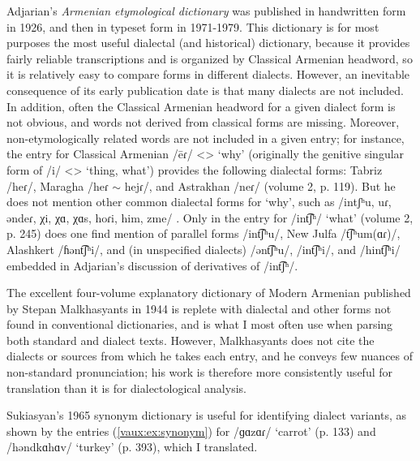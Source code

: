 \documentclass[output=paper]{langscibook}
\begin{document}
Adjarian's \textit{Armenian etymological dictionary} \citep{Adjarian-1979-Etymology} was  published in handwritten form in  1926, and then in typeset form in 1971-1979. This dictionary is for most purposes the most useful dialectal (and historical) dictionary, because it provides fairly reliable transcriptions and is organized by Classical Armenian headword, so it is relatively easy to compare forms in different dialects. However, an inevitable consequence of its early publication date is that many dialects are not included. In addition, often the Classical Armenian headword for a given dialect form is not obvious, and words not derived from classical forms are missing. Moreover, non-etymologically related words are not included in a given entry; for instance, the entry for Classical Armenian /ēɾ/ <> `why' (originally the genitive singular form of /i/ <> `thing, what') provides the following dialectal forms: Tabriz /heɾ/, Maragha /heɾ $\sim$ hejɾ/, and Astrakhan /neɾ/ (volume 2, p. 119). But he does not mention other common dialectal forms for `why', such as /intʃʰu, uɾ, əndeɾ, χi, χɑ, χɑs, hoɾi, him, zme/ \citep[cf.][234]{Sukiasyan-1965-Synonymdictionary}. Only in the entry for /int͡ʃʰ/ `what' (volume 2, p. 245) does one find mention of parallel forms /int͡ʃʰu/, New Julfa /t͡ʃʰum(ɑɾ)/, Alashkert /ɦənt͡ʃʰi/, and (in unspecified dialects) /ənt͡ʃʰu/, /int͡ʃʰi/, and /hint͡ʃʰi/ embedded in Adjarian's discussion of derivatives of /int͡ʃʰ/. 



The excellent four-volume explanatory dictionary of Modern Armenian published by Stepan Malkhasyants   in 1944 \citep{Malkhasiants-1944-ArmenianDictionary} is replete with dialectal and other forms not found in conventional dictionaries, and is what I most often use when parsing both standard and dialect texts. However, Malkhasyants does not cite the dialects or sources from which he takes each entry, and he conveys few nuances of non-standard pronunciation; his work is therefore more consistently useful for translation than it is for dialectological analysis.

Sukiasyan's 1965  synonym dictionary \citep{Sukiasyan-1965-Synonymdictionary} is useful for identifying dialect variants, as shown by the entries (\ref{vaux:ex:synonym}) for  /ɡɑzɑɾ/ `carrot' (p. 133) and /həndkɑhɑv/ `turkey' (p. 393), which I translated.
\end{document}
